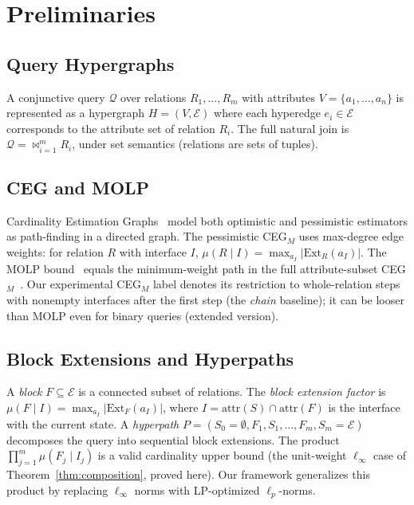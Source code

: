 \documentclass[sigconf, nonacm, acmthm=false]{acmart}
\newcommand{\query}{\mathcal{Q}}
\newcommand{\rel}{R}
\newcommand{\block}{F}
\newcommand{\interface}{I}
\newcommand{\joinstate}{S}
\newcommand{\muFactor}[2]{\mu(#1 \mid #2)}
\newcommand{\ext}[2]{\text{Ext}_{#1}(#2)}
\newcommand{\attr}[1]{\text{attr}(#1)}
\begin{document}
\section{Preliminaries}
\label{sec:prelim}

\subsection{Query Hypergraphs}

A conjunctive query $\query$ over relations $\rel_1, \ldots, \rel_m$
with attributes $V = \{a_1, \ldots, a_n\}$ is represented as a
hypergraph $H = (V, \mathcal{E})$ where each hyperedge $e_i \in
\mathcal{E}$ corresponds to the attribute set of relation $\rel_i$.
The full natural join is $\query = \bowtie_{i=1}^{m} \rel_i$, under set semantics (relations are sets of tuples).

\subsection{CEG and MOLP}

Cardinality Estimation Graphs~\cite{chen2022ceg,salihoglu2026ceg} model
both optimistic and pessimistic estimators as path-finding in a directed
graph.
The pessimistic CEG$_M$ uses max-degree edge weights: for relation
$\rel$ with interface $\interface$,
$\muFactor{\rel}{\interface} = \max_{a_\interface}
|\ext{\rel}{a_\interface}|$.
The MOLP bound~\cite{joglekar2016molp} equals the minimum-weight path in the full attribute-subset CEG$_M$~\cite{chen2022ceg}. Our experimental CEG$_M$ label denotes its restriction to whole-relation steps with nonempty interfaces after the first step (the \emph{chain} baseline); it can be looser than MOLP even for binary queries (extended version).

\subsection{Block Extensions and Hyperpaths}\label{sec:blocks}

A \emph{block} $\block \subseteq \mathcal{E}$ is a connected subset
of relations.
The \emph{block extension factor} is
$\muFactor{\block}{\interface} = \max_{a_\interface}
|\ext{\block}{a_\interface}|$,
where $\interface = \attr{\joinstate} \cap \attr{\block}$ is the
interface with the current state.
A \emph{hyperpath} $P = (\joinstate_0{=}\emptyset, \block_1,
\joinstate_1, \ldots, \block_m, \joinstate_m{=}\mathcal{E})$
decomposes the query into sequential block extensions.
The product $\prod_{j=1}^{m} \muFactor{\block_j}{\interface_j}$ is
a valid cardinality upper bound (the unit-weight $\ell_\infty$ case of Theorem~\ref{thm:composition}, proved here).
Our framework generalizes this product by replacing $\ell_\infty$
norms with LP-optimized $\ell_p$-norms.
\end{document}
